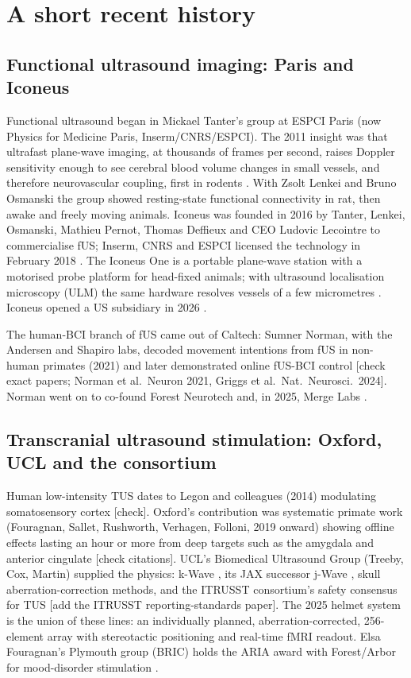 \documentclass[11pt,a4paper]{article}
\newcommand{\todo}[1]{\textcolor{red!70!black}{[#1]}}
\begin{document}
\section{A short recent history}

\subsection{Functional ultrasound imaging: Paris and Iconeus}

Functional ultrasound began in Mickael Tanter's group at ESPCI Paris (now Physics for Medicine Paris, Inserm/CNRS/ESPCI). The 2011 insight was that ultrafast plane-wave imaging, at thousands of frames per second, raises Doppler sensitivity enough to see cerebral blood volume changes in small vessels, and therefore neurovascular coupling, first in rodents \cite{iconeus_story}. With Zsolt Lenkei and Bruno Osmanski the group showed resting-state functional connectivity in rat, then awake and freely moving animals. Iconeus was founded in 2016 by Tanter, Lenkei, Osmanski, Mathieu Pernot, Thomas Deffieux and CEO Ludovic Lecointre to commercialise fUS; Inserm, CNRS and ESPCI licensed the technology in February 2018 \cite{iconeus_story}. The Iconeus One is a portable plane-wave station with a motorised probe platform for head-fixed animals; with ultrasound localisation microscopy (ULM) the same hardware resolves vessels of a few micrometres \cite{iconeus_one}. Iconeus opened a US subsidiary in 2026 \cite{iconeus_us}.

The human-BCI branch of fUS came out of Caltech: Sumner Norman, with the Andersen and Shapiro labs, decoded movement intentions from fUS in non-human primates (2021) and later demonstrated online fUS-BCI control \todo{check exact papers; Norman et al.\ Neuron 2021, Griggs et al.\ Nat.\ Neurosci.\ 2024}. Norman went on to co-found Forest Neurotech and, in 2025, Merge Labs \cite{merge}.

\subsection{Transcranial ultrasound stimulation: Oxford, UCL and the consortium}

Human low-intensity TUS dates to Legon and colleagues (2014) modulating somatosensory cortex \todo{check}. Oxford's contribution was systematic primate work (Fouragnan, Sallet, Rushworth, Verhagen, Folloni, 2019 onward) showing offline effects lasting an hour or more from deep targets such as the amygdala and anterior cingulate \todo{check citations}. UCL's Biomedical Ultrasound Group (Treeby, Cox, Martin) supplied the physics: k-Wave \cite{kwave}, its JAX successor j-Wave \cite{jwave}, skull aberration-correction methods, and the ITRUSST consortium's safety consensus for TUS \cite{itrusst} \todo{add the ITRUSST reporting-standards paper}. The 2025 helmet system \cite{martin2025} is the union of these lines: an individually planned, aberration-corrected, 256-element array with stereotactic positioning and real-time fMRI readout. Elsa Fouragnan's Plymouth group (BRIC) holds the ARIA award with Forest/Arbor for mood-disorder stimulation \cite{forest1}.
\end{document}
